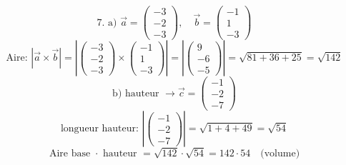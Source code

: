\documentclass{article}
\begin{document}
\[
\text{7. a) } \vec{a} = \begin{pmatrix} -3 \\ -2 \\ -3 \end{pmatrix}, \quad \vec{b} = \begin{pmatrix} -1 \\ 1 \\ -3 \end{pmatrix}
\]
\[
\text{Aire: } |\vec{a} \times \vec{b}| = \left| \begin{pmatrix} -3 \\ -2 \\ -3 \end{pmatrix} \times \begin{pmatrix} -1 \\ 1 \\ -3 \end{pmatrix} \right| = \left| \begin{pmatrix} 9 \\ -6 \\ -5 \end{pmatrix} \right| = \sqrt{81 + 36 + 25} = \sqrt{142}
\]
\[
\text{b) hauteur } \rightarrow \vec{c} = \begin{pmatrix} -1 \\ -2 \\ -7 \end{pmatrix}
\]
\[
\text{longueur hauteur: } \left| \begin{pmatrix} -1 \\ -2 \\ -7 \end{pmatrix} \right| = \sqrt{1 + 4 + 49} = \sqrt{54}
\]
\[
\text{Aire base } \cdot \text{ hauteur } = \sqrt{142} \cdot \sqrt{54} = 142 \cdot 54 \quad \text{(volume)}
\]
\end{document}
